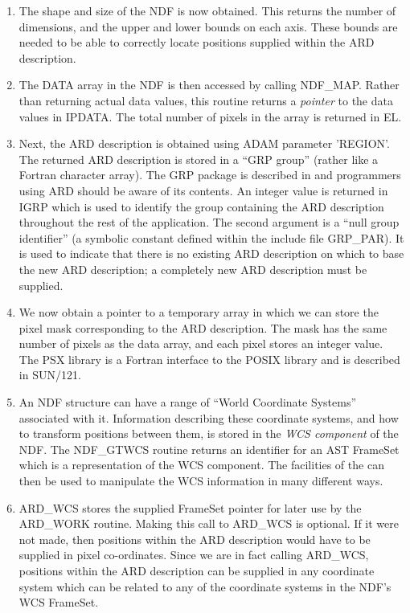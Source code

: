\begin{enumerate}
\item The shape and size of the NDF is now obtained. This returns the number of
dimensions, and the upper and lower bounds on each axis. These bounds are needed
to be able to correctly locate positions supplied within the ARD description. 

\item The DATA array in the NDF is then accessed by calling NDF\_MAP. Rather 
than returning actual data values, this routine returns a {\em pointer} to the 
data values in IPDATA. The total number of pixels in the array is returned in 
EL.

\item Next, the ARD description is obtained using ADAM parameter 'REGION'. The
returned ARD description is stored in a ``GRP group'' (rather like a Fortran
character array). The GRP package is described in  and programmers using
ARD should be aware of its contents. An integer value is returned in IGRP
which is used to identify the group containing the ARD description throughout
the rest of the application. The second argument is a ``null group identifier''
(a symbolic constant defined within the include file GRP\_PAR). It is used to
indicate that there is no existing ARD description on which to base the new ARD
description; a completely new ARD description must be supplied. 

\item We now obtain a pointer to a temporary array in which we can store the
pixel mask corresponding to the ARD description. The mask has the same number of
pixels as the data array, and each pixel stores an integer value. The PSX 
library is a Fortran interface to the POSIX library and is described in SUN/121.

\item An NDF structure can have a range of ``World Coordinate Systems''
associated with it. Information describing these coordinate systems, and
how to transform positions between them, is stored in the {\em WCS
component} of the NDF. The NDF\_GTWCS routine returns an identifier for an 
AST FrameSet which is a representation of the WCS component. The facilities 
of the  can then be used to manipulate the WCS 
information in many different ways.

\item ARD\_WCS stores the supplied FrameSet pointer for later use by the 
ARD\_WORK routine. Making this call to ARD\_WCS is
optional. If it were not made, then positions within the ARD description  
would have to be supplied in pixel co-ordinates. Since we are in fact
calling ARD\_WCS, positions within the ARD description can be supplied in
any coordinate system which can be related to any of the coordinate
systems in the NDF's WCS FrameSet.


\end{enumerate}
